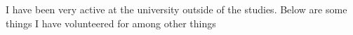 

\divider



I have been very active at the university outside of the studies. Below are some
things I have volunteered for among other things

\medskip



\divider \newpage



\divider




